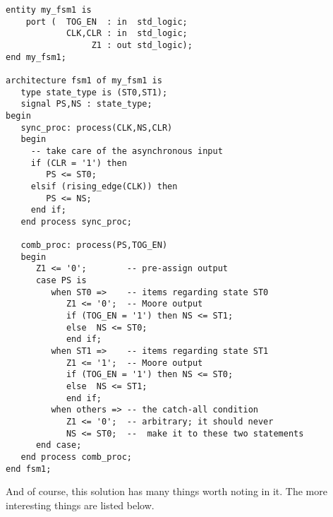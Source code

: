 \begin{lstlisting}[label=exe_18_code, caption=Solution to Example 18.]
entity my_fsm1 is 
    port (  TOG_EN  : in  std_logic; 
            CLK,CLR : in  std_logic; 
                 Z1 : out std_logic); 
end my_fsm1;

architecture fsm1 of my_fsm1 is
   type state_type is (ST0,ST1); 
   signal PS,NS : state_type; 
begin
   sync_proc: process(CLK,NS,CLR)
   begin
     -- take care of the asynchronous input
     if (CLR = '1') then 
        PS <= ST0;  
     elsif (rising_edge(CLK)) then 
        PS <= NS; 
     end if; 
   end process sync_proc; 

   comb_proc: process(PS,TOG_EN)
   begin
      Z1 <= '0';        -- pre-assign output
      case PS is 
         when ST0 =>    -- items regarding state ST0
            Z1 <= '0';  -- Moore output
            if (TOG_EN = '1') then NS <= ST1; 
            else  NS <= ST0; 
            end if; 
         when ST1 =>    -- items regarding state ST1
            Z1 <= '1';  -- Moore output
            if (TOG_EN = '1') then NS <= ST0; 
            else  NS <= ST1; 
            end if; 
         when others => -- the catch-all condition
            Z1 <= '0';  -- arbitrary; it should never 
            NS <= ST0;  --  make it to these two statements
      end case; 
   end process comb_proc; 
end fsm1;
\end{lstlisting}

And of course, this solution has many things worth noting in it. The more interesting things are listed below. 

